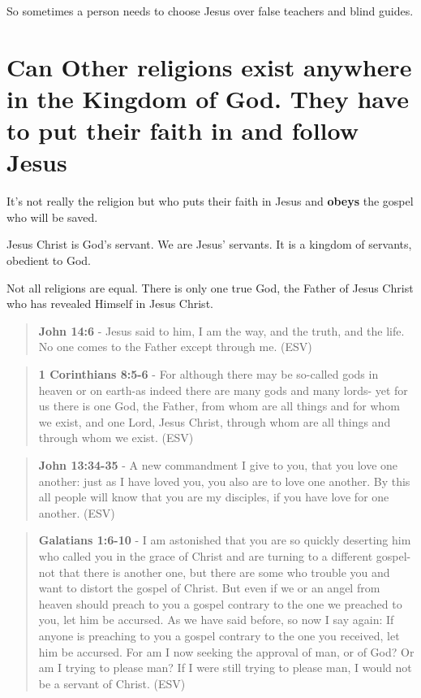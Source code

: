 \documentclass[11pt]{article}
\begin{document}
So sometimes a person needs to choose Jesus over false teachers and blind guides.

\section{Can Other religions exist anywhere in the Kingdom of God. They have to put their faith in and follow Jesus}
\label{sec:orge0250b7}
It's not really the religion but who puts their faith in Jesus and \textbf{obeys} the gospel who will be saved.

Jesus Christ is God's servant. We are Jesus' servants. It is a kingdom of servants, obedient to God.

Not all religions are equal. There is only one true God, the Father of Jesus Christ who has revealed Himself in Jesus Christ.

\begin{quote}
\textbf{John 14:6} - Jesus said to him, I am the way, and the truth, and the life. No one comes to the Father except through me. (ESV)
\end{quote}

\begin{quote}
\textbf{1 Corinthians 8:5-6} - For although there may be so-called gods in heaven or on earth-as indeed there are many gods and many lords- yet for us there is one God, the Father, from whom are all things and for whom we exist, and one Lord, Jesus Christ, through whom are all things and through whom we exist. (ESV)
\end{quote}

\begin{quote}
\textbf{John 13:34-35} - A new commandment I give to you, that you love one another: just as I have loved you, you also are to love one another. By this all people will know that you are my disciples, if you have love for one another. (ESV)
\end{quote}

\begin{quote}
\textbf{Galatians 1:6-10} - I am astonished that you are so quickly deserting him who called you in the grace of Christ and are turning to a different gospel- not that there is another one, but there are some who trouble you and want to distort the gospel of Christ. But even if we or an angel from heaven should preach to you a gospel contrary to the one we preached to you, let him be accursed. As we have said before, so now I say again: If anyone is preaching to you a gospel contrary to the one you received, let him be accursed. For am I now seeking the approval of man, or of God? Or am I trying to please man? If I were still trying to please man, I would not be a servant of Christ. (ESV)
\end{quote}
\end{document}
